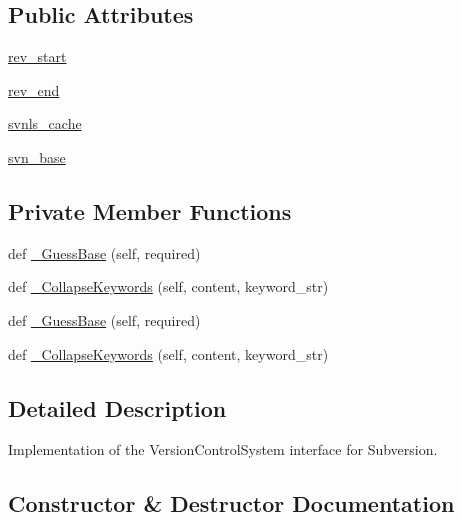 \subsection*{Public Attributes}
\begin{DoxyCompactItemize}
\item 
\mbox{\hyperlink{classupload_1_1_subversion_v_c_s_ad1553a69f4a790309273dbdeb9077732}{rev\+\_\+start}}
\item 
\mbox{\hyperlink{classupload_1_1_subversion_v_c_s_ac0bb07a099c722b7f8622de4b225904f}{rev\+\_\+end}}
\item 
\mbox{\hyperlink{classupload_1_1_subversion_v_c_s_aa801782f807674b06f491df5d7ca9942}{svnls\+\_\+cache}}
\item 
\mbox{\hyperlink{classupload_1_1_subversion_v_c_s_a60645c40d2fea4cd52881576bd13341f}{svn\+\_\+base}}
\end{DoxyCompactItemize}
\subsection*{Private Member Functions}
\begin{DoxyCompactItemize}
\item 
def \mbox{\hyperlink{classupload_1_1_subversion_v_c_s_ad257205675d7d9d291145f4aa405964b}{\+\_\+\+Guess\+Base}} (self, required)
\item 
def \mbox{\hyperlink{classupload_1_1_subversion_v_c_s_ab484ddd61e217927fb61639bacdbb68d}{\+\_\+\+Collapse\+Keywords}} (self, content, keyword\+\_\+str)
\item 
def \mbox{\hyperlink{classupload_1_1_subversion_v_c_s_ad257205675d7d9d291145f4aa405964b}{\+\_\+\+Guess\+Base}} (self, required)
\item 
def \mbox{\hyperlink{classupload_1_1_subversion_v_c_s_ab484ddd61e217927fb61639bacdbb68d}{\+\_\+\+Collapse\+Keywords}} (self, content, keyword\+\_\+str)
\end{DoxyCompactItemize}


\subsection{Detailed Description}
\begin{DoxyVerb}Implementation of the VersionControlSystem interface for Subversion.\end{DoxyVerb}
 

\subsection{Constructor \& Destructor Documentation}
\mbox{\label{classupload_1_1_subversion_v_c_s_a8333f94e27335ce83eed0cc3f5a1eeb0}} 
